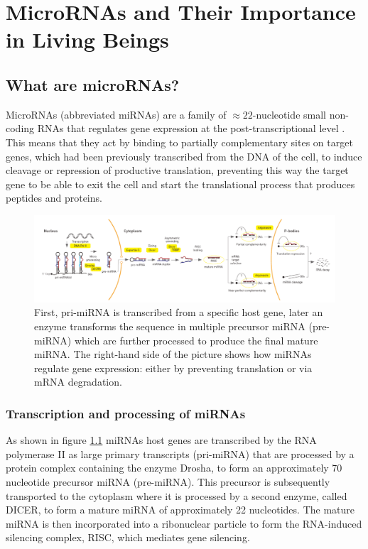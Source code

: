 
\chapter{MicroRNAs and Their Importance in Living Beings} %

\label{Chapter2} %


\section{What are microRNAs?}
MicroRNAs (abbreviated miRNAs) are a family of $\approx 22$-nucleotide small non-coding RNAs that regulates gene expression at the post-transcriptional level \cite{mirna_intro}. This means that they act by binding to partially complementary sites on target genes, which had been previously transcribed from the DNA of the cell, to induce cleavage or repression of productive translation, preventing this way the target gene to be able to exit the cell and start the translational process that produces peptides and proteins.

\begin{figure}[hbt!]
	\centering
	\includegraphics[width=1.0\textwidth]{Figures/mirna_genesis}
	\caption{ First, pri-miRNA is transcribed from a specific host gene, later an enzyme transforms the sequence in multiple precursor miRNA (pre-miRNA) which are further processed to produce the final mature miRNA. The right-hand side of the picture shows how miRNAs regulate gene expression: either by preventing translation or via mRNA degradation.}
	\label{fig:mirna_genesis}
\end{figure}

\subsection{Transcription and processing of miRNAs}
As shown in figure \ref{fig:mirna_genesis} miRNAs host genes are transcribed by the RNA polymerase II as large primary transcripts (pri-miRNA) that are processed by a protein complex containing the enzyme Drosha, to form an approximately 70 nucleotide precursor miRNA (pre-miRNA). This precursor is subsequently transported to the cytoplasm where it is processed by a second enzyme, called DICER, to form a mature miRNA of approximately 22 nucleotides. The mature miRNA is then incorporated into a ribonuclear particle to form the RNA-induced silencing complex, RISC, which mediates gene silencing.

